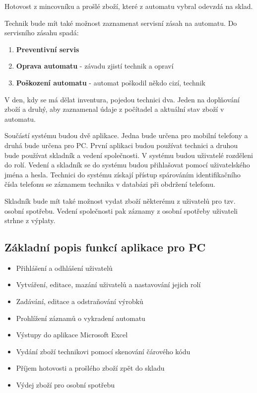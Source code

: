 \documentclass[a4paper,10pt]{article}
\begin{document}
Hotovost z mincovníku a prošlé zboží, které z automatu vybral odevzdá na sklad.

Technik bude mít také možnost zaznamenat servisní zásah na automatu. Do servisního zásahu spadá:
\begin{enumerate}
	\item \textbf{Preventivní servis}
	\item \textbf{Oprava automatu} - závadu zjistí technik a opraví
	\item \textbf{Poškození automatu} - automat poškodil někdo cizí, technik
\end{enumerate}

V den, kdy se má dělat inventura, pojedou technici dva. Jeden na doplňování zboží a druhý, aby zaznamenal údaje z počítadel a aktuální stav zboží v automatu.

Součástí systému budou dvě aplikace. Jedna bude určena pro mobilní telefony a druhá bude určena pro PC. První aplikaci budou používat technici a druhou bude používat skladník a vedení společnosti. V systému budou uživatelé rozděleni do rolí. Vedení a skladník se do systému budou přihlašovat pomocí uživatelského jména a hesla. Technici do systému získají přístup spárováním identifikačního čísla telefonu se záznamem technika v databázi při obdržení telefonu.

Skladník bude mít také možnost vydat zboží některému z uživatelů pro tzv. osobní spotřebu. Vedení společnosti pak záznamy z osobní spotřeby uživateli strhne z výplaty.

\subsection{Základní popis funkcí aplikace pro PC}
\begin{itemize}
  \item Přihlášení a odhlášení uživatelů
  \item Vytváření, editace, mazání uživatelů a nastavování jejich rolí
  \item Zadávání, editace a odstraňování výrobků
  \item Prohlížení záznamů o vykradení automatu
  \item Výstupy do aplikace Microsoft Excel
  \item Vydání zboží technikovi pomocí skenování čárového kódu
  \item Příjem hotovosti a prošlého zboží zpět do skladu
  \item Výdej zboží pro osobní spotřebu
\end{itemize}
\end{document}
